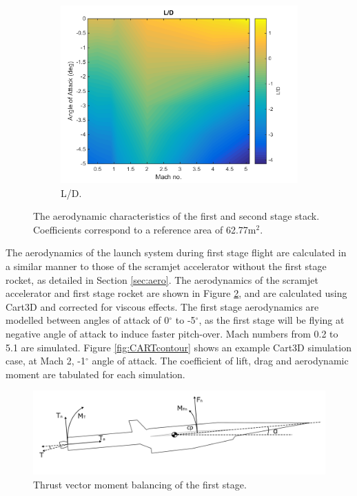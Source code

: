 \begin{figure}[ht]
\begin{subfigure}{.5\textwidth}
    		\centering
    		\includegraphics[width=0.99\linewidth]{figures/3_vehicle_design/FirstStageLD}
    		\caption{L/D.}
    		\label{fig:LD-EFirstStage}
    	\end{subfigure}
    	\caption{The aerodynamic characteristics of the first and second stage stack.  Coefficients correspond to a reference area of 62.77m$^2$.}
    	\label{fig:FirstStageAero}
    \end{figure}
    \noindent
  The aerodynamics of the launch system during first stage flight are calculated in a similar manner to those of the scramjet accelerator without the first stage rocket, as detailed in Section \ref{sec:aero}. 
  The aerodynamics of the scramjet accelerator and first stage rocket are shown in Figure \ref{fig:FirstStageAero}, and are calculated using Cart3D and corrected for viscous effects. The first stage aerodynamics are modelled between angles of attack of 0$^\circ$ to -5$^\circ$, as the first stage will be flying at negative angle of attack to induce faster pitch-over. Mach numbers from 0.2 to 5.1 are simulated. Figure \ref{fig:CARTcontour} shows an example Cart3D simulation case, at Mach 2, -1$^\circ$ angle of attack. The coefficient of lift, drag and aerodynamic moment are tabulated for each simulation. 
  \begin{figure}[!ht]
  	\centering
  	\includegraphics[width=1.0\linewidth]{figures/3_vehicle_design/FirstStageThrustVec}
  	\caption{Thrust vector moment balancing of the first stage.}
  	\label{fig:FirstStageThrustVec}
  \end{figure}
